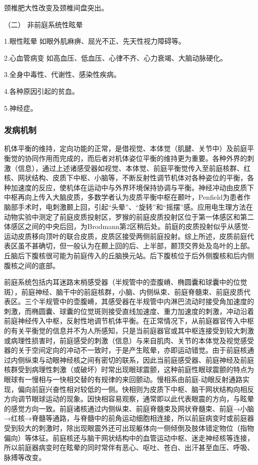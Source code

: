 颈椎肥大性改变及颈椎间盘突出。

\hypertarget{text00012.htmlux5cux23CHP1-3-1-1-2}{}
（二） 非前庭系统性眩晕

1.眼性眩晕 如眼外肌麻痹、屈光不正、先天性视力障碍等。

2.心血管病变 如高血压、低血压、心律不齐、心力衰竭、大脑动脉硬化。

3.全身中毒性、代谢性、感染性疾病。

4.各种原因引起的贫血。

5.神经症。

\subsubsection{发病机制}

机体平衡的维持，定向功能的正常，是借视觉、本体觉（肌腱、关节中）及前庭平衡觉的协同作用而完成的，而后者对机体姿位平衡的维持更为重要。各种外界的刺激（信息），通过上述诸感受器如视觉、本体觉、前庭平衡觉传入至前庭核群、红核、网状结构、皮质下中枢、小脑等，不断反射性调节机体对各种姿位的平衡，各种加速度的反应，使机体在运动中与外界环境保持协调与平衡。神经冲动由皮质下中枢再向上传入大脑皮质，多数学者认为皮质平衡中枢在颞叶，Penfield为患者作脑部手术时，电刺激颞上回，引起“头晕”、“旋转”和“摇摆”感。应用电生理方法在动物实验中测定了前庭皮质投射区，罗猴的前庭皮质投射区位于第一体感区和第二体感区之间的中央后回，为Brodmann第2区稍后处。前庭的皮质投射似乎从感觉-运动皮质移向顶叶的联合皮质，皮质区接受两侧前庭投射。综上所述，皮质前庭代表区虽不甚确切，但一般认为在颞上回的后、上半部，颞顶交界处及岛叶的上部。丘脑后下腹核很可能为前庭传入的丘脑换元站。后下腹核位于后外侧腹核和后内侧腹核之间的底部。

前庭系统包括内耳迷路末梢感受器（半规管中的壶腹嵴、椭圆囊和球囊中的位觉斑），前庭神经、脑干中的前庭核群，小脑、内侧纵束、前庭脊髓束、前庭皮质代表区。三个半规管中的壶腹嵴，其感受器在半规管中内淋巴流动时接受角加速度的刺激，而椭圆囊、球囊的位觉斑则接受直线加速度、重力加速度的刺激，冲动沿着前庭神经传入中枢，反射性地调节机体平衡。在正常情况下，从前庭器官传入中枢的有关平衡觉的信息并不为人所感知，只是当前庭器官或其中枢连接受到较大刺激或病理性损害时，前庭感受的刺激（信息）与来自肌肉、关节的本体觉及视觉感受器的关于空间定向的冲动不一致时，于是产生眩晕，亦即运动错觉。由于前庭核通过内侧纵束与动眼神经核之间有密切的联系，因此当前庭感受器、前庭神经及前庭核群受到病理性刺激（或破坏）时常出现眼球震颤，这种前庭性眼球震颤的特点为眼球有一慢相与一快相交替的有规律的来回颤动。慢相系由前庭-动眼反射通路实现，偏向前庭兴奋性相对较低的一侧。快相则为皮质下中枢、脑干网状结构向相反方向调节眼球运动的现象。因快相容易观察，通常即以此代表眼震的方向，与眩晕的感觉方向一致。前庭诸核通过内侧纵束、前庭脊髓束及网状脊髓束、前庭→小脑→红核→脊髓等通路，与脊髓中的前角运动细胞相连接，所以前庭病变时或前庭器受到较大的刺激时，除出现眼震外还可出现躯体向一侧倾倒及肢体错定物位（指物偏向）等体征。前庭核还与脑干网状结构中的血管运动中枢、迷走神经核等连接，所以前庭器病变时在眩晕的同时常伴有恶心、呕吐、苍白、出汗甚至血压、呼吸、脉搏等改变。

